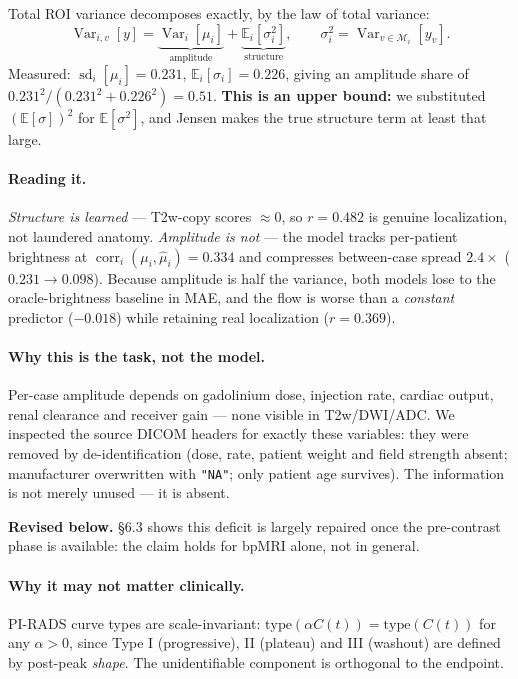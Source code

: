 \documentclass[11pt]{article}
\newcommand{\roi}{\mathcal{M}}
\newcommand{\Var}{\operatorname{Var}}
\newcommand{\Ex}{\mathbb{E}}
\newcommand{\1}{\mathbb{1}}
\newcommand{\flag}[1]{\textcolor{red!60!black}{\textbf{#1}}}
\begin{document}
Total ROI variance decomposes exactly, by the law of total variance:
\begin{equation}
\Var_{i,v}[y]=\underbrace{\Var_i[\mu_i]}_{\text{amplitude}}+\underbrace{\Ex_i[\sigma_i^2]}_{\text{structure}},
\qquad \sigma_i^2=\Var_{v\in\roi_i}[y_v].
\end{equation}
Measured: $\operatorname{sd}_i[\mu_i]=0.231$, $\Ex_i[\sigma_i]=0.226$, giving an amplitude
share of $0.231^2/(0.231^2+0.226^2)=\mathbf{0.51}$.
\flag{This is an upper bound:} we substituted $(\Ex[\sigma])^2$ for $\Ex[\sigma^2]$, and
Jensen makes the true structure term at least that large.

\paragraph{Reading it.}
\emph{Structure is learned} --- T2w-copy scores $\approx0$, so $r=0.482$ is genuine
localization, not laundered anatomy. \emph{Amplitude is not} --- the model tracks per-patient
brightness at $\operatorname{corr}_i(\mu_i,\hat\mu_i)=0.334$ and compresses between-case
spread $2.4\times$ ($0.231\to0.098$). Because amplitude is half the variance, both models
lose to the oracle-brightness baseline in MAE, and the flow is worse than a \emph{constant}
predictor ($-0.018$) while retaining real localization ($r=0.369$).

\paragraph{Why this is the task, not the model.} Per-case amplitude depends on gadolinium
dose, injection rate, cardiac output, renal clearance and receiver gain --- none visible in
T2w/DWI/ADC. We inspected the source DICOM headers for exactly these variables: they were
removed by de-identification (dose, rate, patient weight and field strength absent;
manufacturer overwritten with \texttt{"NA"}; only patient age survives). The information is
not merely unused --- it is absent.

\flag{Revised below.} \S6.3 shows this deficit is largely repaired once the pre-contrast
phase is available: the claim holds for bpMRI alone, not in general.

\paragraph{Why it may not matter clinically.} PI-RADS curve types are scale-invariant:
$\text{type}(\alpha C(t))=\text{type}(C(t))$ for any $\alpha>0$, since Type I (progressive),
II (plateau) and III (washout) are defined by post-peak \emph{shape}. The unidentifiable
component is orthogonal to the endpoint.
\end{document}
